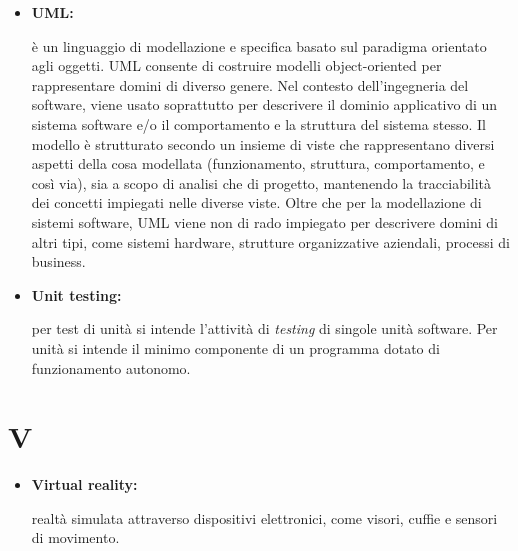 \begin{itemize}
	\item \hypertarget{uml}{\textbf{UML:}} è un linguaggio di modellazione e specifica basato sul paradigma orientato agli oggetti. UML consente di costruire modelli object-oriented per rappresentare domini di diverso genere. Nel contesto dell'ingegneria del software, viene usato soprattutto per descrivere il dominio applicativo di un sistema software e/o il comportamento e la struttura del sistema stesso. Il modello è strutturato secondo un insieme di viste che rappresentano diversi aspetti della cosa modellata (funzionamento, struttura, comportamento, e così via), sia a scopo di analisi che di progetto, mantenendo la tracciabilità dei concetti impiegati nelle diverse viste. Oltre che per la modellazione di sistemi software, UML viene non di rado impiegato per descrivere domini di altri tipi, come sistemi hardware, strutture organizzative aziendali, processi di business.
	\item \hypertarget{ut}{\textbf{Unit testing:}} per test di unità si intende l'attività di \textit{testing} di singole unità software. Per unità si intende il minimo componente di un programma dotato di funzionamento autonomo. 
\end{itemize}

\section*{V}

\begin{itemize}
	\item \hypertarget{vr}{\textbf{Virtual reality:}} realtà simulata attraverso dispositivi elettronici, come visori, cuffie e sensori di movimento.
\end{itemize}